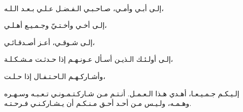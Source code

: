 \ \vfill{}
\begin{center}
    {
        \Large\bfseries
    }
\end{center}

\begin{RLtext}
    إلـى أبـي وأمـي، صـاحـبـي الـفـضـل عـلـي بـعـد الـلـه،
    
    إلـى أخـي وأخـتـيّ وجـمـيـع أهـلـي،

    إلـى شـوقـي، أعـز أصـدقـائـي،
    
    إلـى أولـئـك الـذيـن أسـأل عـونـهـم إذا حـدثـت مـشـكـلـة،
    
    وأشـاركـهـم الـاحـتـفـال إذا حـلـت،
    
    إلـيـكـم جـمـيـعـا، أهـدي هـذا الـعـمـل.
    أنـتـم مـن شـاركـتـمـونـي تـعـبـه وسـهـره وهـمـه،
    ولـيـس مـن أحـد أحـق مـنـكـم أن يـشـاركـنـي فـرحـتـه.
\end{RLtext}

\vfill{}
\pagebreak